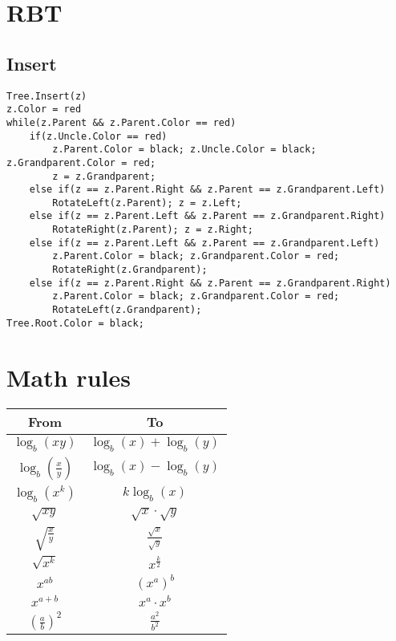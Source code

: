 \documentclass{article}
\begin{document}
\section{RBT}
\subsection{Insert}
\begin{lstlisting}
Tree.Insert(z)
z.Color = red
while(z.Parent && z.Parent.Color == red)
    if(z.Uncle.Color == red) 
        z.Parent.Color = black; z.Uncle.Color = black; z.Grandparent.Color = red; 
        z = z.Grandparent;
    else if(z == z.Parent.Right && z.Parent == z.Grandparent.Left) 
        RotateLeft(z.Parent); z = z.Left;
    else if(z == z.Parent.Left && z.Parent == z.Grandparent.Right) 
        RotateRight(z.Parent); z = z.Right;
    else if(z == z.Parent.Left && z.Parent == z.Grandparent.Left) 
        z.Parent.Color = black; z.Grandparent.Color = red; 
        RotateRight(z.Grandparent);
    else if(z == z.Parent.Right && z.Parent == z.Grandparent.Right) 
        z.Parent.Color = black; z.Grandparent.Color = red; 
        RotateLeft(z.Grandparent);
Tree.Root.Color = black;
\end{lstlisting}

\section{Math rules}
\begin{table}[H]
    \begin{tabular}{|c|c|}
    \hline
        \textbf{From} & \textbf{To} \\
    \hline
        \(\log_b{(xy)}\) & \(\log_b{(x)} + \log_b{(y)}\) \\
    \hline
        \(\log_b{(\frac{x}{y})}\) & \(\log_b{(x)} - \log_b{(y)}\) \\
    \hline
        \(\log_b{(x^k)}\) & \(k \log_b{(x)}\) \\
    \hline
        \(\sqrt{xy}\) & \(\sqrt{x} \cdot \sqrt{y}\) \\
    \hline
        \(\sqrt{\frac{x}{y}}\) & \(\frac{\sqrt{x}}{\sqrt{y}}\) \\
    \hline
        \(\sqrt{x^k}\) & \(x^{\frac{k}{2}}\) \\
    \hline
        \(x^{ab}\) & \((x^a)^b\) \\
    \hline
        \(x^{a+b}\) & \(x^a \cdot x^b\) \\
    \hline
        \((\frac{a}{b})^2\) & \(\frac{a^2}{b^2}\) \\
    \hline
    \end{tabular}
\end{table}
\end{document}
